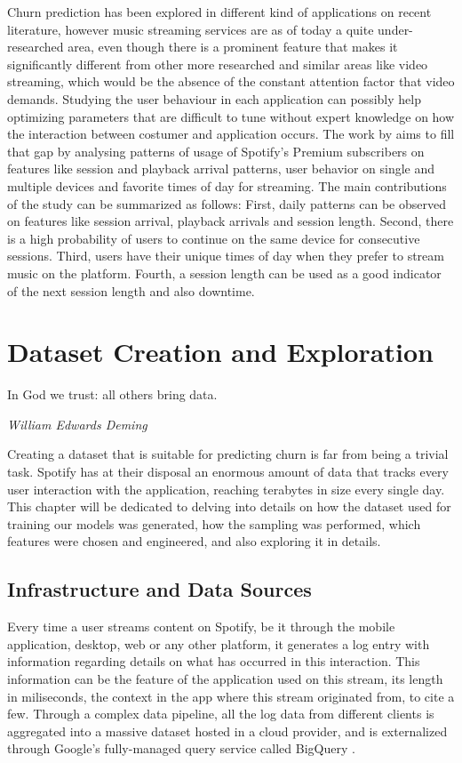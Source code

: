 \documentclass{kththesis}
\begin{document}
Churn prediction has been explored in different kind of applications on recent literature, however music streaming services are as of today a quite under-researched area, even though there is a prominent feature that makes it significantly different from other more researched and similar areas like video streaming, which would be the absence of the constant attention factor that video demands. Studying the user behaviour in each application can possibly help optimizing parameters that are difficult to tune without expert knowledge on how the interaction between costumer and application occurs. The work by \citep{Zhang2013} aims to fill that gap by analysing patterns of usage of Spotify's Premium subscribers on features like session and playback arrival patterns, user behavior on single and multiple devices and favorite times of day for streaming. The main contributions of the study can be summarized as follows: First, daily patterns can be observed on features like session arrival, playback arrivals and session length. Second, there is a high probability of users to continue on the same device for consecutive sessions. Third, users have their unique times of day when they prefer to stream music on the platform. Fourth, a session length can be used as a good indicator of the next session length and also downtime.

\chapter{Dataset Creation and Exploration}
\label{cha:data}

\epigraph{In God we trust: all others bring data.}{\textit{William Edwards Deming}}

Creating a dataset that is suitable for predicting churn is far from being a trivial task. Spotify has at their disposal an enormous amount of data that tracks every user interaction with the application, reaching terabytes in size every single day. This chapter will be dedicated to delving into details on how the dataset used for training our models was generated, how the sampling was performed, which features were chosen and engineered, and also exploring it in details.

\section{Infrastructure and Data Sources}

Every time a user streams content on Spotify, be it through the mobile application, desktop, web or any other platform, it generates a log entry with information regarding details on what has occurred in this interaction. This information can be the feature of the application used on this stream, its length in miliseconds, the context in the app where this stream originated from, to cite a few. Through a complex data pipeline, all the log data from different clients is aggregated into a massive dataset hosted in a cloud provider, and is externalized through Google's fully-managed query service called BigQuery \citep{sato2012inside}. 
\end{document}
